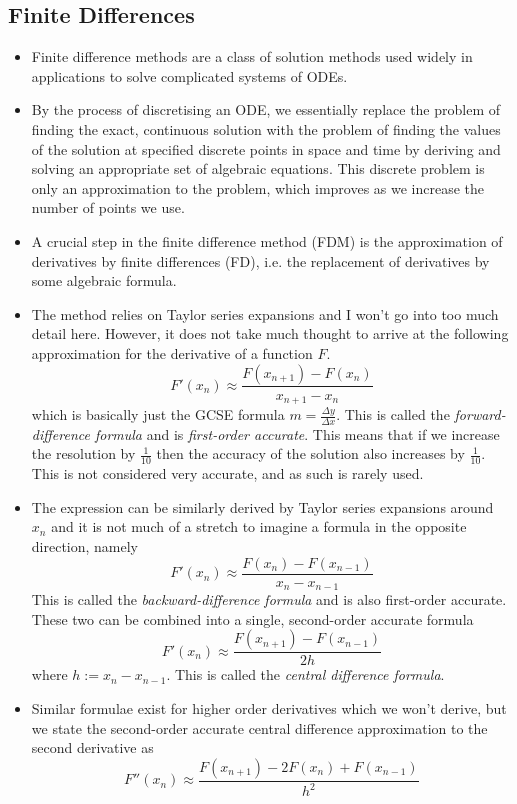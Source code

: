 \documentclass[12pt]{report}
\begin{document}
\subsection*{Finite Differences}

\begin{itemize}
\item Finite difference methods are a class of solution methods used widely in applications to solve complicated systems of ODEs.
\item By the process of discretising an ODE, we essentially replace the problem of finding
the exact, continuous solution with the problem of finding the values of
the solution at specified discrete points in space and time by deriving and solving an
appropriate set of algebraic equations. This discrete problem is only an approximation
to the problem, which improves as we increase the number of points we use.
\item A crucial step in the finite difference method (FDM) is the approximation of derivatives by finite differences (FD), i.e. the replacement of derivatives by some algebraic
formula.
\item The method relies on Taylor series expansions and I won't go into too much detail here. However, it does not take much thought to arrive at the following approximation for the derivative of a function $F$.
\begin{displaymath}
F'(x_n) \approx \frac{F(x_{n+1}) - F(x_n)}{x_{n+1}-x_n}
\end{displaymath}
which is basically just the GCSE formula $m = \frac{\Delta y}{\Delta x}$. This is called the \textit{forward-difference formula} and is \textit{first-order accurate}. This means that if we increase the resolution by $\frac{1}{10}$ then the accuracy of the solution also increases by $\frac{1}{10}$. This is not considered very accurate, and as such is rarely used.
\item The expression can be similarly derived by Taylor series expansions around $x_n$ and it is not much of a stretch to imagine a formula in the opposite direction, namely 
\begin{displaymath}
F'(x_n) \approx \frac{F(x_{n}) - F(x_{n-1})}{x_{n}-x_{n-1}}
\end{displaymath}
This is called the \textit{backward-difference formula} and is also first-order accurate. These two can be combined into a single, second-order accurate formula 
\begin{displaymath}
F'(x_n) \approx \frac{F(x_{n+1}) - F(x_{n-1})}{2h}
\end{displaymath}
where $h := x_{n}-x_{n-1}$. This is called the \textit{central difference formula}.
\item Similar formulae exist for higher order derivatives which we won't derive, but we state the second-order accurate central difference approximation to the second derivative as 
\begin{displaymath}
F''(x_n) \approx \frac{F(x_{n+1}) - 2F(x_n)  + F(x_{n-1})}{h^2}
\end{displaymath}

\end{itemize}
\end{document}
